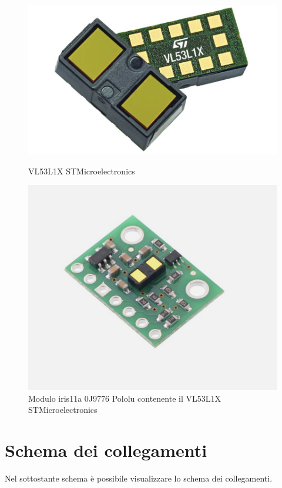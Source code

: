 \documentclass[11pt]{report}
\begin{document}
\begin{figure}[H]
    \centering
    \begin{minipage}{0.45\textwidth}
        \centering
        \includegraphics[width=\textwidth]{images/Immagine_3_VL53L1X.png}
        \caption{VL53L1X STMicroelectronics}
        \label{fig:img1}
    \end{minipage}
    \hfill
    \begin{minipage}{0.45\textwidth}
        \centering
        \includegraphics[width=\textwidth]{images/Immagine_4_Pololu.png}
        \caption{Modulo iris11a 0J9776 Pololu contenente il VL53L1X STMicroelectronics}
        \label{fig:img2}
    \end{minipage}
\end{figure}
\section{Schema dei collegamenti}
Nel sottostante schema è possibile visualizzare lo schema dei collegamenti.
\end{document}
